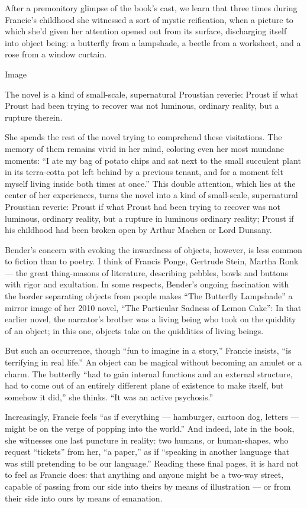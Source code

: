 After a premonitory glimpse of the book's cast, we learn that three
times during Francie's childhood she witnessed a sort of mystic
reification, when a picture to which she'd given her attention opened
out from its surface, discharging itself into object being: a butterfly
from a lampshade, a beetle from a worksheet, and a rose from a window
curtain.

Image

The novel is a kind of small-scale, supernatural Proustian reverie:
Proust if what Proust had been trying to recover was not luminous,
ordinary reality, but a rupture therein.

She spends the rest of the novel trying to comprehend these visitations.
The memory of them remains vivid in her mind, coloring even her most
mundane moments: ``I ate my bag of potato chips and sat next to the
small succulent plant in its terra-cotta pot left behind by a previous
tenant, and for a moment felt myself living inside both times at once.''
This double attention, which lies at the center of her experiences,
turns the novel into a kind of small-scale, supernatural Proustian
reverie: Proust if what Proust had been trying to recover was not
luminous, ordinary reality, but a rupture in luminous ordinary reality;
Proust if his childhood had been broken open by Arthur Machen or Lord
Dunsany.

Bender's concern with evoking the inwardness of objects, however, is
less common to fiction than to poetry. I think of Francis Ponge,
Gertrude Stein, Martha Ronk --- the great thing-masons of literature,
describing pebbles, bowls and buttons with rigor and exultation. In some
respects, Bender's ongoing fascination with the border separating
objects from people makes ``The Butterfly Lampshade'' a mirror image of
her 2010 novel, ``The Particular Sadness of Lemon Cake'': In that
earlier novel, the narrator's brother was a living being who took on the
quiddity of an object; in this one, objects take on the quiddities of
living beings.

But such an occurrence, though ``fun to imagine in a story,'' Francie
insists, ``is terrifying in real life.'' An object can be magical
without becoming an amulet or a charm. The butterfly ``had to gain
internal functions and an external structure, had to come out of an
entirely different plane of existence to make itself, but somehow it
did,'' she thinks. ``It was an active psychosis.''

Increasingly, Francie feels ``as if everything --- hamburger, cartoon
dog, letters --- might be on the verge of popping into the world.'' And
indeed, late in the book, she witnesses one last puncture in reality:
two humans, or human-shapes, who request ``tickets'' from her, ``a
paper,'' as if ``speaking in another language that was still pretending
to be our language.'' Reading these final pages, it is hard not to feel
as Francie does: that anything and anyone might be a two-way street,
capable of passing from our side into theirs by means of illustration
--- or from their side into ours by means of emanation.

